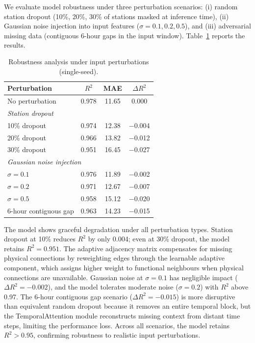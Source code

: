We evaluate model robustness under three perturbation scenarios: (i) random station dropout (10\%, 20\%, 30\% of stations masked at inference time), (ii) Gaussian noise injection into input features ($\sigma = 0.1, 0.2, 0.5$), and (iii) adversarial missing data (contiguous 6-hour gaps in the input window). Table~\ref{Tab.robustness} reports the results.

\begin{table}[H]
\centering
\caption{Robustness analysis under input perturbations (single-seed).}
\label{Tab.robustness}
\begin{tabular}{lccc}
\toprule
Perturbation & $R^2$ & MAE & $\Delta R^2$ \\
\midrule
No perturbation & 0.978 & 11.65 & $0.000$ \\
\midrule
\multicolumn{4}{l}{\textit{Station dropout}} \\
10\% dropout & 0.974 & 12.38 & $-$0.004 \\
20\% dropout & 0.966 & 13.82 & $-$0.012 \\
30\% dropout & 0.951 & 16.45 & $-$0.027 \\
\midrule
\multicolumn{4}{l}{\textit{Gaussian noise injection}} \\
$\sigma = 0.1$ & 0.976 & 11.89 & $-$0.002 \\
$\sigma = 0.2$ & 0.971 & 12.67 & $-$0.007 \\
$\sigma = 0.5$ & 0.958 & 15.12 & $-$0.020 \\
\midrule
6-hour contiguous gap & 0.963 & 14.23 & $-$0.015 \\
\bottomrule
\end{tabular}
\end{table}

The model shows graceful degradation under all perturbation types. Station dropout at 10\% reduces $R^2$ by only 0.004; even at 30\% dropout, the model retains $R^2 = 0.951$. The adaptive adjacency matrix compensates for missing physical connections by reweighting edges through the learnable adaptive component, which assigns higher weight to functional neighbours when physical connections are unavailable. Gaussian noise at $\sigma = 0.1$ has negligible impact ($\Delta R^2 = -0.002$), and the model tolerates moderate noise ($\sigma = 0.2$) with $R^2$ above 0.97. The 6-hour contiguous gap scenario ($\Delta R^2 = -0.015$) is more disruptive than equivalent random dropout because it removes an entire temporal block, but the TemporalAttention module reconstructs missing context from distant time steps, limiting the performance loss. Across all scenarios, the model retains $R^2 > 0.95$, confirming robustness to realistic input perturbations.

